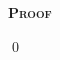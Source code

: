 \documentclass[12pt,a4paper]{scrartcl}
\numberwithin{equation}{section}
\numberwithin{myalgctr}{section}
\newcounter{mytheoremctr}
\newenvironment{mytheorem}{%
	\bigskip\noindent%
	\refstepcounter{mytheoremctr}%
	\textsc{\textbf{Theorem} \themytheoremctr}%
	\newline
}{\par\bigskip}  %
\numberwithin{mytheoremctr}{section}
\newenvironment{myproof}{%
	\bigskip\noindent%
	\textsc{\textbf{Proof}}%
	\indent
}{\qed\par\bigskip}  %
\numberwithin{myexamplectr}{subsection}
\begin{document}
\begin{myproof}
	
\end{myproof}
%	
%	
%	
%	
%		
%		
%		
%		
%		
%		
%
\end{document}
